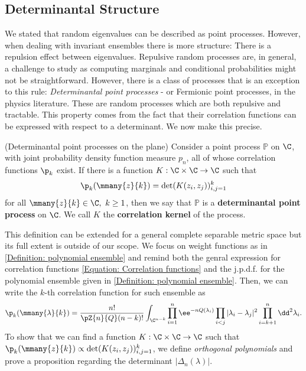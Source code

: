\subsection{Determinantal Structure}
\label{Section: determinantal structure}

We stated that random eigenvalues can be described as point processes. However, when dealing with invariant ensembles there is more structure: There is a repulsion effect between eigenvalues. Repulsive random processes are, in general, a challenge to study as computing marginals and conditional probabilities might not be straightforward. However, there is a class of processes that is an exception to this rule: \textit{Determinantal point processes} - or Fermionic point processes, in the physics literature. These are random processes which are both repulsive and tractable. \cite{Tremblay} This property comes from the fact that their correlation functions can be expressed with respect to a determinant. We now make this precise.

\begin{definicao} (Determinantal point processes on the plane)
	Consider a point process $\mathbb{P}$ on $\C$, with joint probability density function measure $p_n$, all of whose correlation functions $\p_k$ exist. If there is a function $K: \C \times \C \rightarrow \C$ such that 
	\begin{equation}
		\p_k(\mmany{z}{k}) = \det(K(z_i, z_j))_{i,j = 1}^{k}
	\end{equation}
	for all $\mmany{z}{k} \in \C, \ k \geq 1$, then we say that $\mathbb{P}$ is a \textbf{determinantal point process} on $\C$. We call $K$ the \textbf{correlation kernel} of the process.
\end{definicao}

This definition can be extended for a general complete separable metric space but its full extent is outside of our scope. We focus on weight functions as in \autoref{Definition: polynomial ensemble} and remind both the genral expression for correlation functions \eqref{Equation: Correlation functions} and the j.p.d.f. for the polynomial ensemble given in \autoref{Definition: polynomial ensemble}. Then, we can write the $k$-th correlation function for such ensemble as 
\begin{equation}
		\p_k(\mmany{\lambda}{k}) = \frac{n!}{\pZ{n}{Q}(n-k)!} \int_{\C^{n-k}}  \prod_{i=1}^{n} \ee^{-n Q(\lambda_i)} \prod_{i < j} |\lambda_i - \lambda_j|^2 \prod_{i=k+1}^{n} \dd^2 \lambda_i.
\end{equation}
To show that we can find a function $K: \C \times \C \rightarrow \C$ such that $\p_k(\mmany{z}{k}) \propto \det(K(z_i, z_j))_{i,j = 1}^{k}$, we define \textit{orthogonal polynomials} and prove a proposition regarding the determinant $|\Delta_n(\lambda)|$.


